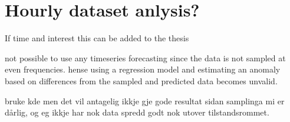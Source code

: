     \section{Hourly dataset anlysis?}
        If time and interest this can be added to the thesis 
    

    

    
    not possible to use any timeseries forecasting since the data is not sampled at even frequencies. hense using a regression model and estimating an anomaly based on differences from the sampled and predicted data becomes unvalid. 
    
    bruke kde men det vil antagelig ikkje gje gode resultat sidan samplinga mi er dårlig, og eg ikkje har nok data spredd godt nok utover tilstandsrommet. 




    


    
    


    



